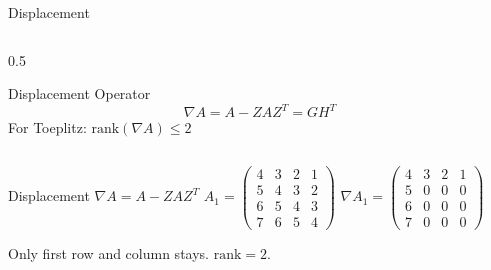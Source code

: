 \begin{frame}{Displacement}

  \begin{columns}
  
    \begin{column}{0.5\textwidth}
    
      \begin{block}{Displacement Operator}
        \[
          \nabla A = A - Z A Z^T = G H^T
        \]
        For Toeplitz: $\mathrm{rank}(\nabla A) \leq 2$
      \end{block}
      
    \end{column}
    
  \end{columns}
  
  \vspace{1em}

  \begin{block}{Displacement $\nabla A = A - ZAZ^T$}
    \centering
    $A_{1} = \begin{pmatrix}
        4 & 3 & 2 & 1 \\
        5 & 4 & 3 & 2 \\
        6 & 5 & 4 & 3 \\
        7 & 6 & 5 & 4
    \end{pmatrix}$
    \quad
    $\nabla A_{1} = \begin{pmatrix}
        4 & 3 & 2 & 1 \\
        5 & 0 & 0 & 0 \\
        6 & 0 & 0 & 0 \\
        7 & 0 & 0 & 0
    \end{pmatrix}$
  \end{block}
Only first row and column stays. $\mathrm{rank} = 2$.
  
\end{frame}